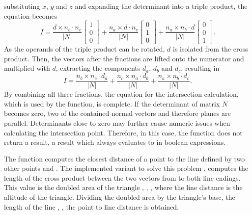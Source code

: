 substituting $x$, $y$ and $z$ and expanding the determinant into a triple product, the equation becomes
\begin{equation*}
	I =
	\frac{d \times n_b \cdot n_c}{|N|} \begin{bmatrix} 1 \\ 0 \\ 0 \end{bmatrix} +
	\frac{n_a \times d \cdot n_c}{|N|} \begin{bmatrix} 0 \\ 1 \\ 0 \end{bmatrix} +
	\frac{n_a \times n_b \cdot d}{|N|} \begin{bmatrix} 0 \\ 0 \\ 1 \end{bmatrix} \text{.}
\end{equation*}
As the operands of the triple product can be rotated, $d$ is isolated from the cross product.
Then, the vectors after the fractions are lifted onto the numerator and multiplied with $d$, extracting the components $d_a$, $d_b$ and $d_c$, resulting in
\begin{equation*}
I =
	\frac{n_b \times n_c \cdot d_a}{|N|} +
	\frac{n_c \times n_a \cdot d_b}{|N|} +
	\frac{n_a \times n_b \cdot d_c}{|N|} \text{.}
\end{equation*}
By combining all three fractions, the equation for the intersection calculation, which is used by the  function, is complete.
If the determinant of matrix $N$ becomes zero, two of the contained normal vectors and therefore planes are parallel.
Determinants close to zero may further cause numeric issues when calculating the intersection point.
Therefore, in this case, the function does not return a result, \ie a result which always evaluates to \False in boolean expressions.

The function  computes the closest distance of a point  to the line defined by two other points  and .
The implemented variant to solve this problem \cite{point_line_distance}, computes the length of the cross product between the two vectors from  to both line endings.
This value is the doubled area of the triangle , , , where the line distance is the altitude of the triangle.
Dividing the doubled area by the triangle's base, \ie the length of the line , , the point to line distance is obtained.


